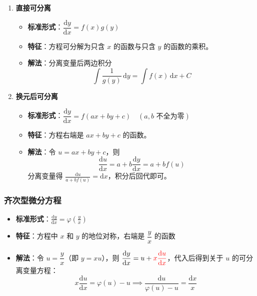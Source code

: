 \documentclass[../book.tex]{subfiles}
\begin{document}
    \begin{enumerate}
        \item \textbf{直接可分离}
        \begin{itemize}
            \item \textbf{标准形式}：$\dfrac{\mathrm{d}y}{\mathrm{d}x} = f(x)g(y)$
            \item \textbf{特征}：方程可分解为只含 $x$ 的函数与只含 $y$ 的函数的乘积。
            \item \textbf{解法}：分离变量后两边积分
            \[
                \int \frac{1}{g(y)}\,\mathrm{d}y = \int f(x)\,\mathrm{d}x + C
            \]
        \end{itemize}


        \item \textbf{换元后可分离}
        \begin{itemize}
            \item \textbf{标准形式}：$\dfrac{\mathrm{d}y}{\mathrm{d}x} = f(ax + by + c) \quad (a, b \text{ 不全为零})$
            \item \textbf{特征}：方程右端是 $ax + by + c$ 的函数。
            \item \textbf{解法}：令 $u = ax + by + c$，则
            \[
                \frac{\mathrm{d}u}{\mathrm{d}x} = a + b\frac{\mathrm{d}y}{\mathrm{d}x} = a + bf(u)
            \]
            分离变量得 $\displaystyle\frac{\mathrm{d}u}{a + bf(u)} = \mathrm{d}x$，积分后回代即可。
        \end{itemize}
    \end{enumerate}

    \subsubsection{齐次型微分方程}

    \begin{itemize}
        \item \textbf{标准形式}：$\displaystyle\frac{\mathrm{d}y}{\mathrm{d}x} = \varphi\left(\frac{y}{x}\right)$
        \item \textbf{特征}：方程中 $x$ 和 $y$ 的地位对称，右端是 $\dfrac{y}{x}$ 的函数
        \item \textbf{解法}：令 $u = \dfrac{y}{x}$（即 $y = xu$），则 $\dfrac{\mathrm{d}y}{\mathrm{d}x} = u + {\color{red}{x\dfrac{\mathrm{d}u}{\mathrm{d}x}}}$，代入后得到关于 $u$ 的可分离变量方程：
        \[
            x\frac{\mathrm{d}u}{\mathrm{d}x} = \varphi(u) - u \implies \frac{\mathrm{d}u}{\varphi(u)-u} = \frac{\mathrm{d}x}{x}
        \]
    \end{itemize}
\end{document}
